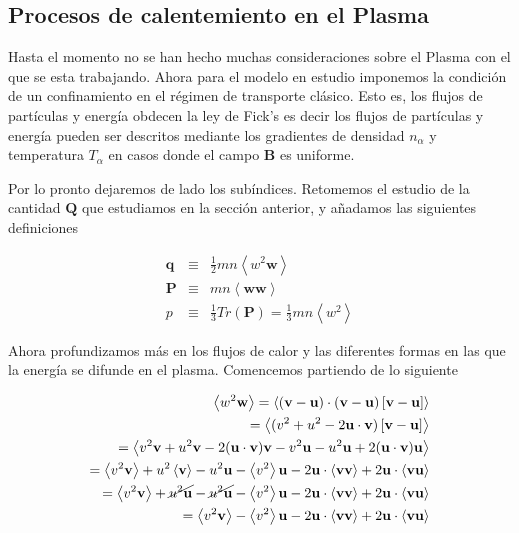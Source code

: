 \subsection{Procesos de calentemiento en el Plasma}

  Hasta el momento no se han hecho muchas consideraciones sobre el Plasma con el que se esta trabajando. Ahora para el modelo en estudio imponemos la condici\'on de un confinamiento en el r\'egimen de transporte cl\'asico. Esto es, los flujos de part\'iculas y energ\'ia obdecen la ley de Fick's es decir los flujos de part\'iculas y energ\'ia pueden ser descritos mediante los gradientes de densidad $n_\alpha$ y temperatura $T_\alpha$ en casos donde el campo $\textbf{B}$ es uniforme.

  Por lo pronto dejaremos de lado los sub\'indices. Retomemos el estudio de la cantidad $\textbf{Q}$ que estudiamos en la secci\'on anterior, y añadamos las siguientes definiciones

  \begin{eqnarray}
    \textbf{q} &\equiv& \frac{1}{2}mn\left<w^2\textbf{w}\right>\label{eq:q} \\
    \textbf{P} &\equiv&  mn\left<\textbf{ww}\right>\label{eq:tensorP} \\
    p &\equiv& \frac{1}{3}Tr(\textbf{P}) = \frac{1}{3}mn\left<w^2\right> \label{eq:pressureanisotropic}
  \end{eqnarray}

  Ahora profundizamos m\'as en los flujos de calor y las diferentes formas en las que la energ\'ia se difunde en el plasma. Comencemos partiendo de lo siguiente

  \begin{eqnarray*}
    \left<w^2\textbf{w}\right> = \left<(\textbf{v} - \textbf{u})\cdot(\textbf{v} - \textbf{u})\left[\textbf{v} - \textbf{u}\right]\right> \\
    = \left<(v^2 + u^2 - 2\textbf{u}\cdot\textbf{v})\left[\textbf{v}-\textbf{u}\right]\right> \\
    = \left< v^2\textbf{v} + u^2\textbf{v} - 2(\textbf{u}\cdot\textbf{v})\textbf{v} - v^2\textbf{u} - u^2\textbf{u} + 2(\textbf{u}\cdot\textbf{v})\textbf{u}\right>\\
    = \left<v^2\textbf{v}\right> + u^2\left<\textbf{v}\right> - u^2\textbf{u} - \left<v^2\right>\textbf{u} - 2\textbf{u}\cdot\left<\textbf{vv}\right> + 2\textbf{u}\cdot\left<\textbf{vu}\right>\\
    = \left<v^2\textbf{v}\right> + \cancel{u^2\textbf{u}} - \cancel{u^2\textbf{u}} - \left<v^2\right>\textbf{u} - 2\textbf{u}\cdot\left<\textbf{vv}\right> + 2\textbf{u}\cdot\left<\textbf{vu}\right>\\
    = \left<v^2\textbf{v}\right> -\left<v^2\right>\textbf{u} - 2\textbf{u}\cdot\left<\textbf{vv}\right> + 2\textbf{u}\cdot\left<\textbf{vu}\right>
  \end{eqnarray*}

